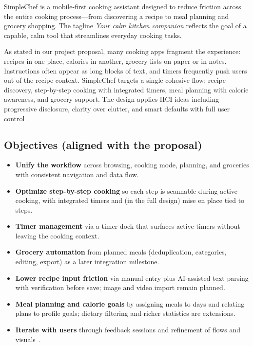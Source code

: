 SimpleChef is a mobile-first cooking assistant designed to reduce friction across the entire cooking process---from discovering a recipe to meal planning and grocery shopping. The tagline \emph{Your calm kitchen companion} reflects the goal of a capable, calm tool that streamlines everyday cooking tasks.

As stated in our project proposal, many cooking apps fragment the experience: recipes in one place, calories in another, grocery lists on paper or in notes. Instructions often appear as long blocks of text, and timers frequently push users out of the recipe context. SimpleChef targets a single cohesive flow: recipe discovery, step-by-step cooking with integrated timers, meal planning with calorie awareness, and grocery support. The design applies HCI ideas including progressive disclosure, clarity over clutter, and smart defaults with full user control~\cite{preece2015,hartson2012ux}.

\subsection{Objectives (aligned with the proposal)}
\begin{itemize}[leftmargin=*]
  \item \textbf{Unify the workflow} across browsing, cooking mode, planning, and groceries with consistent navigation and data flow.
  \item \textbf{Optimize step-by-step cooking} so each step is scannable during active cooking, with integrated timers and (in the full design) mise en place tied to steps.
  \item \textbf{Timer management} via a timer dock that surfaces active timers without leaving the cooking context.
  \item \textbf{Grocery automation} from planned meals (deduplication, categories, editing, export) as a later integration milestone.
  \item \textbf{Lower recipe input friction} via manual entry plus AI-assisted text parsing with verification before save; image and video import remain planned.
  \item \textbf{Meal planning and calorie goals} by assigning meals to days and relating plans to profile goals; dietary filtering and richer statistics are extensions.
  \item \textbf{Iterate with users} through feedback sessions and refinement of flows and visuals~\cite{nielsen1994heuristic}.
\end{itemize}


